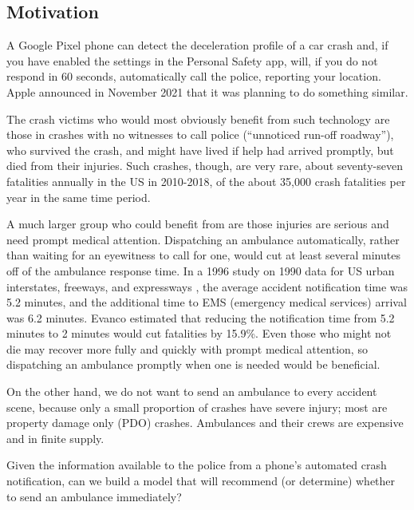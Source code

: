 \subsection{Motivation}



A Google Pixel phone can detect the deceleration profile of a car crash and, if you have enabled the settings in the Personal Safety app, will, if you do not respond in 60 seconds, automatically call the police, reporting your location.  Apple announced in November 2021 that it was planning to do something similar.  

The crash victims who would most obviously benefit from such technology are those in crashes with no witnesses to call police (``unnoticed run-off roadway''), who survived the crash, and might have lived if help had arrived promptly, but died from their injuries.  Such crashes, though, are very rare, about seventy-seven fatalities annually in the US in 2010-2018,   
\citep{SPICER2021105974}
of the about 35,000 crash fatalities per year in the same time period.  \citep{FARS}

A much larger group who could benefit from  are those injuries are serious and need prompt medical attention.  Dispatching an ambulance automatically, rather than waiting for an eyewitness to call for one, would cut at least several minutes off of the ambulance response time.  In a 1996 study on 1990 data for US urban interstates, freeways, and expressways \citep{edsoai.on1047979037n.d.}, the average accident notification time was 5.2 minutes, and the additional time to EMS (emergency medical services) arrival was 6.2 minutes.    Evanco estimated that reducing the notification time from 5.2 minutes to 2 minutes would cut fatalities by 15.9\%.   Even those who might not die may recover more fully and quickly with prompt medical attention, so dispatching an ambulance promptly when one is needed would be beneficial.  

On the other hand, we do not want to send an ambulance to every accident scene, because only a small proportion of crashes have severe injury; most are property damage only (PDO) crashes.  Ambulances and their crews are expensive and in finite supply.  

Given the information available to the police from a phone's automated crash notification, can we build a model that will recommend (or determine) whether to send an ambulance immediately?  




